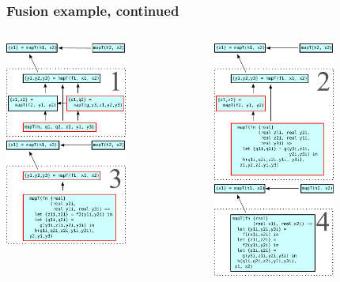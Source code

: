 \documentclass{beamer}
\begin{document}
\begin{frame}[t]
\frametitle{Fusion example, continued}

\begin{center}
\begin{columns}[t]
  \begin{column}{0.5\textwidth}
    \includegraphics[width=4cm]{img/fusion-1.pdf}
    \vspace{1cm}
    \includegraphics[width=4cm]{img/fusion-3.pdf}
  \end{column}

  \begin{column}{0.5\textwidth}
    \includegraphics[width=4cm]{img/fusion-2.pdf}
    \vspace{1cm}
    \includegraphics[width=4cm]{img/fusion-4.pdf}
  \end{column}
\end{columns}
\end{center}

\end{frame}
\end{document}
